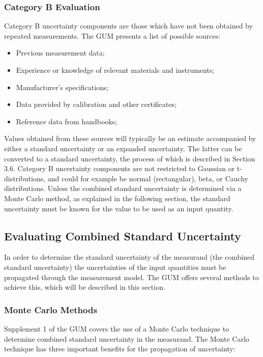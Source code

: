 \documentclass[../thesis/thesis.tex]{subfiles}
\begin{document}
\begin{refsection}
\subsubsection{Category B Evaluation}

Category B uncertainty components are those which have not been obtained by repeated measurements. The GUM presents a list of possible sources:

\begin{itemize}
	\item Previous measurement data;
	\item Experience or knowledge of relevant materials and instruments;
	\item Manufacturer’s specifications;
	\item Data provided by calibration and other certificates;
	\item Reference data from handbooks;
\end{itemize}

Values obtained from these sources will typically be an estimate accompanied by either a standard uncertainty or an expanded uncertainty. The latter can be converted to a standard uncertainty, the process of which is described in Section 3.6. Category B uncertainty components are not restricted to Gaussian or t-distributions, and could for example be normal (rectangular), beta, or Cauchy distributions. Unless the combined standard uncertainty is determined via a Monte Carlo method, as explained in the following section, the standard uncertainty must be known for the value to be used as an input quantity.

\subsection{Evaluating Combined Standard Uncertainty}

In order to determine the standard uncertainty of the measurand (the combined standard uncertainty) the uncertainties of the input quantities must be propagated through the measurement model. The GUM offers several methods to achieve this, which will be described in this section.

\subsubsection{Monte Carlo Methods}

Supplement 1 of the GUM \cite{GUM_S1} covers the use of a Monte Carlo technique to determine combined standard uncertainty in the measurand. The Monte Carlo technique has three important benefits for the propagation of uncertainty:


\end{refsection}
\end{document}
